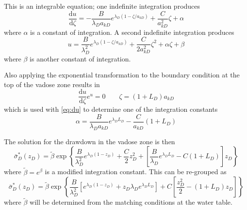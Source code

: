 \documentclass[12pt,letterpaper]{article}
\begin{document}
This is an integrable equation; one indefinite integration produces
\begin{equation}
  \label{eq:du}
  \frac{\mathrm{d} u}{\mathrm{d}\zeta} = - \frac{B}{\lambda_D a_{kD}} e^{\lambda_D (1-\zeta/a_{kD})} + \frac{C}{a_{kD}^2}\zeta + \alpha
\end{equation}
where $\alpha$ is a constant of integration. A second indefinite integration produces
\begin{equation}\nonumber
 u =  \frac{B}{\lambda_D^2} e^{\lambda_D (1-\zeta/a_{kD})} + \frac{C}{2a_{kD}^2}\zeta^2 + \alpha\zeta + \beta
\end{equation}
where $\beta$ is another constant of integration.  

Also applying the exponential transformation to the boundary condition at the top of the vadose zone results in
\begin{equation}\nonumber
\frac{\mathrm{d}u}{\mathrm{d}\zeta} e^u=0 \qquad \zeta= \left(1+ L_D \right) a_{kD}
\end{equation}
which is used with \eqref{eq:du} to determine one of the integration constants
\begin{equation}\nonumber
\alpha= \frac{B}{\lambda_D a_{kD}} e^{\lambda_D L_D} -
\frac{C}{a_{kD}} \left( 1+L_D \right) 
\end{equation}

The solution for the drawdown in the vadose zone is then
\begin{equation}
  \nonumber
  \bar{\sigma}_D^{\ast} (z_D) = \tilde{\beta}\exp\left\{
    \frac{B}{\lambda_D^2} e^{\lambda_D (1-z_D)} + \frac{C}{2}z_D^2
    +\left[ \frac{B}{\lambda_D} e^{\lambda_D L_D}  - C \left( 1+L_D\right) \right]z_D  \right\}
\end{equation}
where $\tilde{\beta}=e^\beta$ is a modified integration constant. This can be re-grouped as
\begin{equation}
  \label{eq:sigma}
  \bar{\sigma}_D^{\ast} (z_D) = \tilde{\beta}\exp\left\{
    \frac{B}{\lambda_D^2} \left[ e^{\lambda_D (1-z_D)} + z_D\lambda_D e^{\lambda_D
        L_D} \right] + C \left[ \frac{z_D^2}{2}
     - \left( 1+L_D\right)z_D  \right] \right\}
\end{equation}
where $\tilde{\beta}$ will be determined from the matching conditions at the water table.
\end{document}
